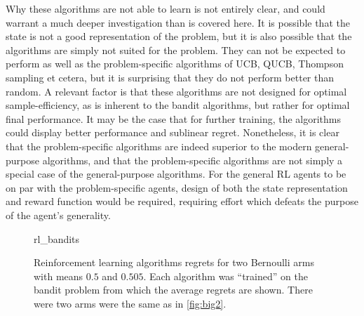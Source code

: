 Why these algorithms are not able to learn is not entirely clear, and could warrant a much deeper investigation than is covered here.
It is possible that the state is not a good representation of the problem, but it is also possible that the algorithms are simply not suited for the problem.
They can not be expected to perform as well as the problem-specific algorithms of UCB, QUCB, Thompson sampling et cetera, but it is surprising that they do not perform better than random.
A relevant factor is that these algorithms are not designed for optimal sample-efficiency, as is inherent to the bandit algorithms, but rather for optimal final performance.
It may be the case that for further training, the algorithms could display better performance and sublinear regret.
Nonetheless, it is clear that the problem-specific algorithms are indeed superior to the modern general-purpose algorithms, and that the problem-specific algorithms are not simply a special case of the general-purpose algorithms.
For the general RL agents to be on par with the problem-specific agents, design of both the state representation and reward function would be required, requiring effort which defeats the purpose of the agent's generality.

\begin{figure}
    \centering
    \newcommand{\myoptions}{
        width=10cm,
        height=8cm,
        xlabel={Kiloturn},
        ylabel={Regret},
        legend entries={A2C, DQN, PPO, QNN},
        legend pos=north west,
        legend cell align=left,
        mystyle,
    }
    {rl_bandits}
    \caption[
        Reinforcement learning algorithms regrets.
    ]
    {
        Reinforcement learning algorithms regrets for two Bernoulli arms with means $0.5$ and $0.505$.
        Each algorithm was \enquote{trained} on the bandit problem from which the average regrets are shown.
        There were two arms were the same as in \cref{fig:big2}.
    }
    \label{fig:rl_bandits}
\end{figure}